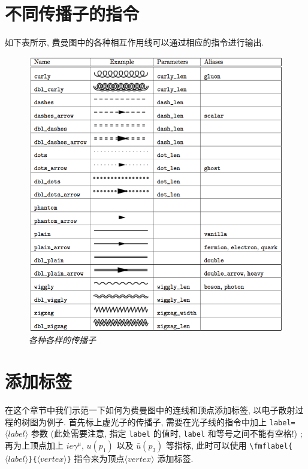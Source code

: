 \documentclass{article}
\begin{document}
\section{不同传播子的指令}
如下表所示, 费曼图中的各种相互作用线可以通过相应的指令进行输出.
\begin{figure}[!htp]
\centering
\includegraphics[width=13cm]{propagator.png}
\caption{\emph{各种各样的传播子}}
\end{figure}

\section{添加标签}
在这个章节中我们示范一下如何为费曼图中的连线和顶点添加标签, 以电子散射过程的树图为例子. 首先标上虚光子的传播子, 需要在光子线的指令中加上 \verb+label=+$\langle label\rangle$ 参数 (此处需要注意, 指定 \verb+label+ 的值时, \verb+label+ 和等号之间不能有空格!) ;再为上顶点加上 $ie\gamma^\mu$, $u(p_1)$ 以及 $\bar{u}(p_3)$ 等指标, 此时可以使用 \verb+\fmflabel{+$\langle label \rangle$\verb+}{+$\langle vertex\rangle$\verb+}+ 指令来为顶点$\langle vertex \rangle$ 添加标签.
\end{document}
